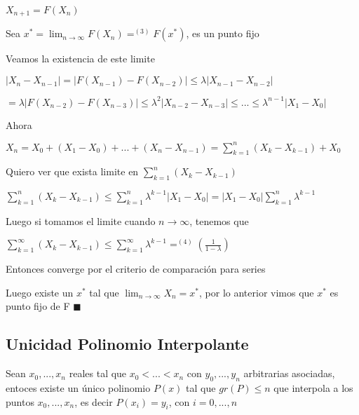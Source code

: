 \documentclass{article}
\begin{document}
$X_{n+1} = F(X_n)$

Sea $x^* = \lim_{n \to \infty} F(X_n) =^{(3)} F(x^*)$, es un punto fijo

\vspace{5mm}

Veamos la existencia de este limite

$|X_n - X_{n-1}| = |F(X_{n-1}) - F(X_{n-2}) | \leq \lambda|X_{n-1}-X_{n-2}| $

$= \lambda|F(X_{n-2}) - F(X_{n-3}) | \leq  \lambda^2|X_{n-2}-X_{n-3}| \leq ... \leq \lambda^{n-1}|X_{1}-X_{0}|$

Ahora

$X_n = X_0 + (X_1-X_0)+...+(X_n-X_{n-1}) = \sum\limits_{k=1}^{n} (X_k - X_{k-1})+X_0$

\vspace{5mm}

Quiero ver que exista limite en $\sum\limits_{k=1}^{n} (X_k - X_{k-1})$

$\sum\limits_{k=1}^{n} (X_k - X_{k-1}) \leq \sum\limits_{k=1}^{n} \lambda^{k-1}|X_1-X_0| = |X_1-X_0|\sum_{k=1}^{n} \lambda^{k-1}$ 

\vspace{5mm}

Luego si tomamos el limite cuando $ n \rightarrow \infty $, tenemos que


$\sum\limits_{k=1}^{\infty} (X_k - X_{k-1}) \leq \sum\limits_{k=1}^{\infty} \lambda^{k-1} =^{(4)} \left( \displaystyle\frac{1}{1-\lambda} \right) $

Entonces converge por el criterio de comparación para series

\vspace{5mm}

Luego existe un $x^*$ tal que $\lim_{n \to \infty} X_n = x^*$, por lo anterior vimos que $x^*$ es punto fijo de F $\blacksquare$


\vspace{10mm}

\subsection{Unicidad Polinomio Interpolante}\label{Unicidad-Polinomio-Interpolante}

Sean $ x_0,...,x_n $ reales tal que $x_0<...<x_n$ con $y_0,...,y_n$ arbitrarias asociadas, entoces
existe un único polinomio $P(x)$ tal que $gr(P) \leq n $ que interpola a los puntos $x_0,...,x_n$, es decir
$P(x_i) = y_i$, con $ i = 0,...,n$

\vspace{5mm}
\end{document}
